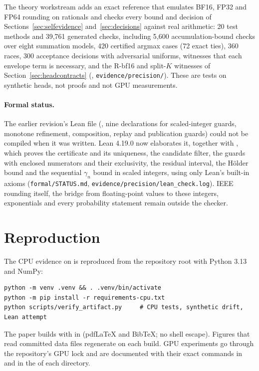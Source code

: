 The theory workstream adds an exact reference that emulates BF16, FP32 and FP64 rounding on rationals and checks every bound and decision of Sections~\ref{sec:selfevidence} and~\ref{sec:decisions} against real arithmetic: 20 test methods and 39,761 generated checks, including 5,600 accumulation-bound checks over eight summation models, 420 certified argmax cases (72 exact ties), 360 races, 300 acceptance decisions with adversarial uniforms, witnesses that each envelope term is necessary, and the R-bf16 and split-$K$ witnesses of Section~\ref{sec:headcontracts} (, \nolinkurl{evidence/precision/}). These are tests on synthetic heads, not proofs and not GPU measurements.

\paragraph{Formal status.} The earlier revision's Lean file (, nine declarations for scaled-integer guards, monotone refinement, composition, replay and publication guards) could not be compiled when it was written. Lean 4.19.0 now elaborates it, together with , which proves the certificate and its uniqueness, the candidate filter, the guards with enclosed numerators and their exclusivity, the residual interval, the Hölder bound and the sequential $\gamma_n$ bound in scaled integers, using only Lean's built-in axioms (\nolinkurl{formal/STATUS.md}, \nolinkurl{evidence/precision/lean_check.log}). IEEE rounding itself, the bridge from floating-point values to these integers, exponentials and every probability statement remain outside the checker.

\section{Reproduction}\label{app:repro}
The CPU evidence on  is reproduced from the repository root with Python 3.13 and NumPy:
\begin{lstlisting}
python -m venv .venv && . .venv/bin/activate
python -m pip install -r requirements-cpu.txt
python scripts/verify_artifact.py     # CPU tests, synthetic drift, Lean attempt
\end{lstlisting}
The paper builds with  in  (pdfLaTeX and BibTeX; no shell escape). Figures that read committed data files regenerate on each build. GPU experiments go through the repository's GPU lock and are documented with their exact commands in  and in the  of each  directory.

